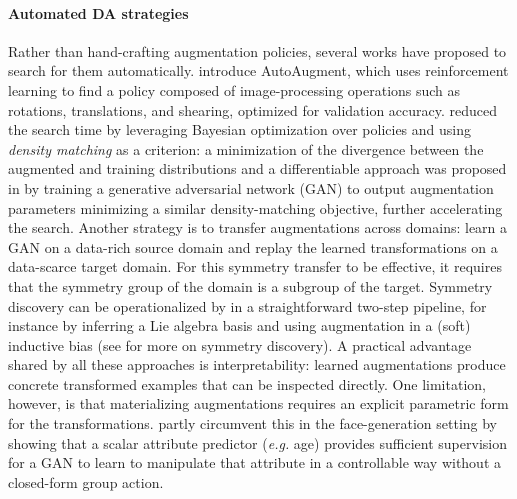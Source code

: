 \documentclass[mathematics,review,submit,moreauthors]{Definitions/mdpi}
\begin{document}
\paragraph{Automated DA strategies}\label{par:auto-da}
Rather than hand-crafting augmentation policies, several works have proposed to search for them automatically.
\citet{cubuk20192iccvprc} introduce AutoAugment, which uses reinforcement learning to find a policy composed of image-processing operations such as rotations, translations, and shearing, optimized for validation accuracy.
\citet{lim2019anips} reduced the search time by leveraging Bayesian optimization over policies and using \textit{density matching} as a criterion: a minimization of the divergence between the augmented and training distributions and a differentiable approach was proposed in \citet{hataya2020cv-e2} by training a generative adversarial network (GAN) to output augmentation parameters minimizing a similar density-matching objective, further accelerating the search.
Another strategy is to transfer augmentations across domains: \citet{antoniou2018} learn a GAN on a data-rich source domain and replay the learned transformations on a data-scarce target domain.
For this symmetry transfer to be effective, it requires that the symmetry group of the domain is a subgroup of the target. 
Symmetry discovery can be operationalized by in a straightforward two-step pipeline, for instance by inferring a Lie algebra basis and using augmentation in a (soft) inductive bias \citep{escriche2025,yang2023p4icml} (see  for more on symmetry discovery).
A practical advantage shared by all these approaches is interpretability: learned augmentations produce concrete transformed examples that can be inspected directly.
One limitation, however, is that materializing augmentations requires an explicit parametric form for the transformations.
\citet{shoshan2021} partly circumvent this in the face-generation setting by showing that a scalar attribute predictor (\textit{e.g.} age) provides sufficient supervision for a GAN to learn to manipulate that attribute in a controllable way without a closed-form group action.
\end{document}
